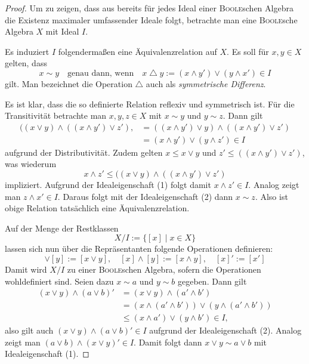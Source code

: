 \begin{proof}
  
  Um zu zeigen, dass aus \PIT bereits für jedes Ideal einer \textsc{Boole}schen Algebra die Existenz maximaler umfassender Ideale folgt, betrachte man eine \textsc{Boole}sche Algebra $X$ mit Ideal $I$.
  
  Es induziert $I$ folgendermaßen eine Äquivalenzrelation auf $X$.
  Es soll für $x,y \in X$ gelten, dass 
  \begin{displaymath}
    x \sim y \quad \text{genau dann, wenn} \quad x \bigtriangleup y := (x \land y') \lor (y \land x') \in I
  \end{displaymath}
  gilt.
  Man bezeichnet die Operation $\bigtriangleup$ auch als \textit{symmetrische Differenz}.

  Es ist klar, dass die so definierte Relation reflexiv und symmetrisch ist.
  Für die Transitivität betrachte man $x,y,z \in X$ mit $x \sim y$ und $y \sim z$.
  Dann gilt
  \begin{align*}
    ((x  \lor y  ) \land ((x \land y') \lor z' ),
    &=  ((x \land y') \lor y  ) \land ((x \land y') \lor z' ) \\
    &= (x \land y') \lor (y \land z') \in I
  \end{align*}
  aufgrund der Distributivität.
  Zudem gelten $x \leq x \lor y$ und $z' \leq ((x \land y') \lor z')$, was wiederum
  \begin{displaymath}
    x \land z' \leq  ((x  \lor y  ) \land ((x \land y') \lor z' )
  \end{displaymath}
  impliziert.
  Aufgrund der Idealeigenschaft (1) folgt damit $x \land z' \in I$.
  Analog zeigt man $z \land x' \in I$.
  Daraus folgt mit der Idealeigenschaft (2) dann $x \sim z$.
  Also ist obige Relation tatsächlich eine Äquivalenzrelation.

  Auf der Menge der Restklassen 
  \begin{displaymath}
    X / I := \{[x] \mid x \in X\}
  \end{displaymath}
  lassen sich nun über die Repräsentanten folgende Operationen definieren:
  \begin{displaymath}
    [x] \lor [y] := [x \lor y], \quad
    [x] \land [y] := [x \land y], \quad
    [x]' := [x']
  \end{displaymath}
  Damit wird $X/I$ zu einer \textsc{Boole}schen Algebra, sofern die Operationen wohldefiniert sind.
  Seien dazu $x \sim a$ und $y \sim b$ gegeben.
  Dann gilt
  \begin{align*}
    (x \lor y) \land (a \lor b)'
    &= (x \lor y) \land (a' \land b') \\
    &= (x \land (a' \land b')) \lor (y \land (a' \land b')) \\
    &\leq (x \land a') \lor (y \land b')  \in I,
  \end{align*}
  also gilt auch $(x \lor y) \land (a \lor b)' \in I$ aufgrund der Idealeigenschaft (2).
  Analog zeigt man $ (a \lor b) \land (x \lor y)' \in I$.
  Damit folgt dann $x \lor y \sim a \lor b$ mit Idealeigenschaft (1).


\end{proof}
